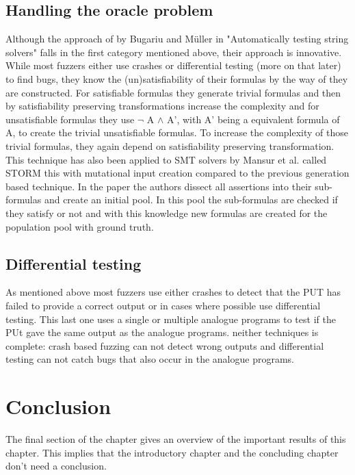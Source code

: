 \subsection{Handling the oracle problem}
Although the approach of by Bugariu and M\"uller in "Automatically testing string solvers"\cite{9bugariu2020automaticallyTestingStringSolvers} falls in the first category mentioned above, their approach is innovative. While most fuzzers either use crashes or differential testing (more on that later) to find bugs, they know the  (un)satisfiability of their formulas by the way of they are constructed. For satisfiable formulas they generate trivial formulas and then by satisfiability preserving transformations increase the complexity and for unsatisfiable formulas they use $\neg$ A $\land$ A', with A' being a equivalent formula of A, to create the trivial unsatisfiable formulas. To increase the complexity of those trivial formulas, they again depend on satisfiability preserving transformation. This technique has also been applied to SMT solvers by Mansur et al. called STORM\cite{1mansur2020detecting} this with mutational input creation compared to the previous generation based technique. In the paper the authors dissect all assertions into their sub-formulas and create an initial pool. In this pool the sub-formulas are checked if they satisfy or not and with this knowledge new formulas are created for the population pool with ground truth.

\subsection{Differential testing}
As mentioned above most fuzzers use either crashes to detect that the PUT has failed to provide a correct output or in cases where possible use differential testing. This last one uses a single or multiple analogue programs to test if the PUt gave the same output as the analogue programs. neither techniques is complete: crash based fuzzing can not detect wrong outputs and differential testing can not catch bugs that also occur in the analogue programs.




\section{Conclusion}
The final section of the chapter gives an overview of the important results
of this chapter. This implies that the introductory chapter and the
concluding chapter don't need a conclusion.



